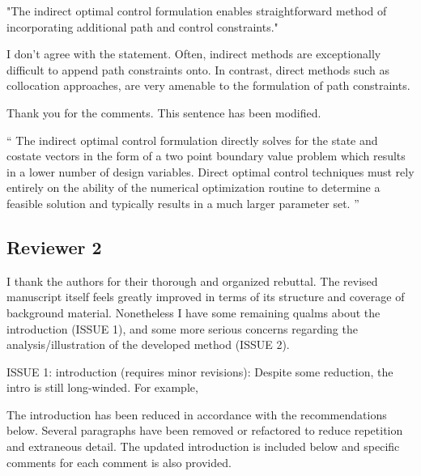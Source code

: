 \documentclass[11pt]{article}
\newenvironment{correction}{\begin{list}{}{\setlength{\leftmargin}{1cm}\setlength{\rightmargin}{1cm}}\vspace{\parsep}\item[]``}{''\end{list}}
\begin{document}
\begin{itemize}
\begin{itshape}
"The indirect optimal control formulation enables straightforward method of incorporating additional path and control constraints."  

I don't agree with the statement. Often, indirect methods are exceptionally difficult to append path constraints onto.  In contrast, direct methods such as collocation approaches, are very amenable to the formulation of path constraints.
    \end{itshape}
    
    Thank you for the comments. This sentence has been modified.
    \begin{correction}
        The indirect optimal control formulation directly solves for the state and costate vectors in the form of a two point boundary value problem which results in a lower number of design variables.
        Direct optimal control techniques must rely entirely on the ability of the numerical optimization routine to determine a feasible solution and typically results in a much larger parameter set.
    \end{correction}
\end{itemize}
\subsection*{Reviewer 2}

\begin{itshape}
I thank the authors for their thorough and organized rebuttal.  The revised manuscript itself feels greatly improved in terms of its structure and coverage of background material.  Nonetheless I have some remaining qualms about the introduction (ISSUE 1), and some more serious concerns regarding the analysis/illustration of the developed method (ISSUE 2). 
\end{itshape}

\begin{itshape}
ISSUE 1: introduction (requires minor revisions): 
Despite some reduction, the intro is still long-winded.  For example,
\end{itshape}

The introduction has been reduced in accordance with the recommendations below.
Several paragraphs have been removed or refactored to reduce repetition and extraneous detail.
The updated introduction is included below and specific comments for each comment is also provided.
\end{document}
